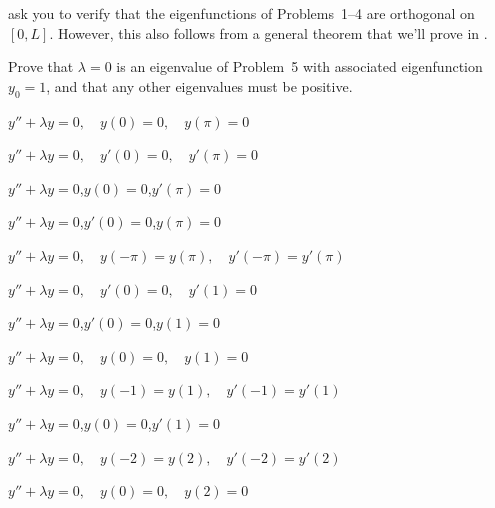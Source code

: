  ask you to verify
that the eigenfunctions of Problems~1--4  are orthogonal
on $[0,L]$. However, this also follows from a general theorem that we'll
prove in .


\exercises

\begin{exerciselist}
\item\label{exer:11.1.1}Prove that $\lambda=0$ is an eigenvalue of Problem~5 with associated
eigenfunction $y_0=1$, and that any other eigenvalues  must be
positive.


\item\label{exer:11.1.2}$y''+\lambda y=0,\quad y(0)=0,\quad y(\pi)=0$

\item\label{exer:11.1.3}$y''+\lambda y=0,\quad y'(0)=0,\quad y'(\pi)=0$

\item\label{exer:11.1.4}$y''+\lambda y=0$,\quad $y(0)=0$,\quad $y'(\pi)=0$

\item\label{exer:11.1.5}$y''+\lambda y=0$,\quad $y'(0)=0$,\quad $y(\pi)=0$

\item\label{exer:11.1.6}$y''+\lambda y=0,\quad y(-\pi)= y(\pi), \quad y'(-\pi)=y'(\pi)$

\item\label{exer:11.1.7}$y''+\lambda y=0,\quad y'(0)=0,\quad y'(1)=0$

\item\label{exer:11.1.8}$y''+\lambda y=0$,\quad $y'(0)=0$,\quad $y(1)=0$

\item\label{exer:11.1.9}$y''+\lambda y=0,\quad y(0)=0,\quad y(1)=0$

\item\label{exer:11.1.10}$y''+\lambda y=0,\quad y(-1)= y(1), \quad y'(-1)=y'(1)$

\item\label{exer:11.1.11}$y''+\lambda y=0$,\quad $y(0)=0$,\quad $y'(1)=0$

\item\label{exer:11.1.12}$y''+\lambda y=0,\quad y(-2)= y(2), \quad y'(-2)=y'(2)$

\item\label{exer:11.1.13}$y''+\lambda y=0,\quad y(0)=0,\quad y(2)=0$


\end{exerciselist}
